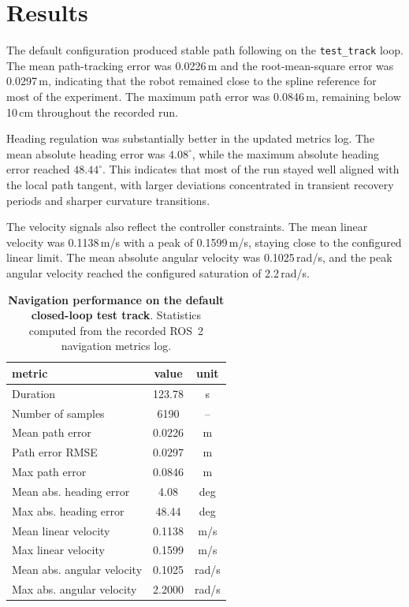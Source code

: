 \documentclass[12pt,a4paper]{cibb}
\begin{document}
\section{Results}
\label{sec:RESULTS}

The default configuration produced stable path following on the \texttt{test\_track} loop. The mean path-tracking error was 0.0226\,m and the root-mean-square error was 0.0297\,m, indicating that the robot remained close to the spline reference for most of the experiment. The maximum path error was 0.0846\,m, remaining below 10\,cm throughout the recorded run.

Heading regulation was substantially better in the updated metrics log. The mean absolute heading error was $4.08^\circ$, while the maximum absolute heading error reached $48.44^\circ$. This indicates that most of the run stayed well aligned with the local path tangent, with larger deviations concentrated in transient recovery periods and sharper curvature transitions.

The velocity signals also reflect the controller constraints. The mean linear velocity was 0.1138\,m/s with a peak of 0.1599\,m/s, staying close to the configured linear limit. The mean absolute angular velocity was 0.1025\,rad/s, and the peak angular velocity reached the configured saturation of 2.2\,rad/s.

\begin{table}[httb!] \small
\centering
    \begin{tabularx}{0.7\textwidth}{ l  c  c }
        \toprule
          \textbf{metric} & \textbf{value} & \textbf{unit} \\
        \midrule
        \rowcolor{LightBlue} Duration & 123.78 & s \\
        Number of samples & 6190 & -- \\
        \rowcolor{LightBlue} Mean path error & 0.0226 & m \\
        Path error RMSE & 0.0297 & m \\
        \rowcolor{LightBlue} Max path error & 0.0846 & m \\
        Mean abs. heading error & 4.08 & deg \\
        \rowcolor{LightBlue} Max abs. heading error & 48.44 & deg \\
        Mean linear velocity & 0.1138 & m/s \\
        \rowcolor{LightBlue} Max linear velocity & 0.1599 & m/s \\
        Mean abs. angular velocity & 0.1025 & rad/s \\
        \rowcolor{LightBlue} Max abs. angular velocity & 2.2000 & rad/s \\
        \bottomrule
    \end{tabularx}
    \caption{\textbf{Navigation performance on the default closed-loop test track}.
    Statistics computed from the recorded ROS~2 navigation metrics log.\label{tab:RESULTS}}
\end{table}
\end{document}
